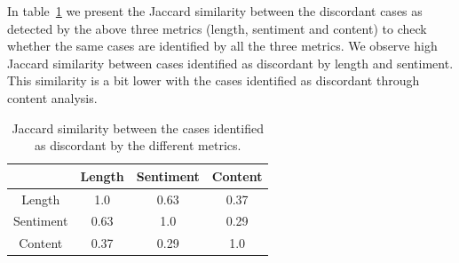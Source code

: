 In table~\ref{tab:jacc} we present the Jaccard similarity between the discordant cases as detected by the above three metrics (length, sentiment and content) to check 
whether the same cases are identified by all the three metrics. 
We observe high Jaccard similarity between cases identified as discordant by length and sentiment. This similarity is a bit lower with the cases identified as discordant 
through content analysis.

\begin{table}[]
\centering
\caption{Jaccard similarity between the cases identified as discordant by the different metrics.}
\label{tab:jacc}
\begin{tabular}{c|c|c|c}
\hline
          & Length & Sentiment & Content \\ \hline
Length    &    1.0    &   0.63        &  0.37       \\ 
Sentiment &    0.63    &   1.0        &  0.29       \\ 
Content   &    0.37    &   0.29        &  1.0       \\ \hline
\end{tabular}
\vspace{4mm}
\end{table}



